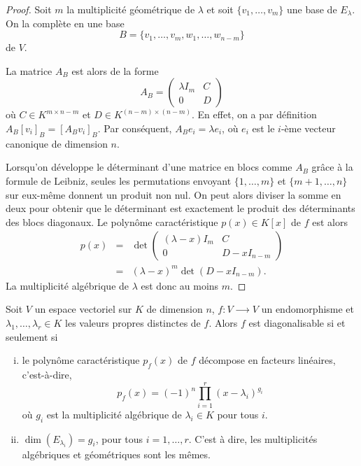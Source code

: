   \begin{proof}
    Soit $m$ la multiplicité géométrique de $λ$ et soit  $\{v_1,\dots,v_m\}$  une base de $E_{λ}$. On la complète en une base
    \begin{displaymath}
B =     \{ v_1,\dots,v_m, w_1,\dots,w_{n-m}\} 
    \end{displaymath}
    de $V$.

    La matrice $A_B$ est alors de la forme
    \begin{displaymath}
      A_B =
      \begin{pmatrix}
        λ I_m & C \\
        0 & D
      \end{pmatrix}
    \end{displaymath}
    où $C ∈ K^{m × n-m}$ et $D ∈ K^{(n-m) ×(n-m)}$. En effet, on a par définition $A_B[v_i]_{B} = [A_B v_i]_{B}$. Par conséquent, $A_B e_i = \lambda e_i$, où $e_i$ est le $i$-ème vecteur canonique de dimension $n$.
    
    Lorsqu'on développe le déterminant d'une matrice en blocs comme $A_B$ grâce à la formule de Leibniz, seules les permutations envoyant $\{1, \dots, m\}$ et $\{m+1, \dots, n\}$ sur eux-même donnent un produit non nul. On peut alors diviser la somme en deux pour obtenir que le déterminant est exactement le produit des déterminants des blocs diagonaux.
    Le polynôme caractéristique $p(x) ∈ K[x]$ de $f$ est alors
    \begin{eqnarray*} p(x) & = &  
      \det   \begin{pmatrix}
        (λ -x) I_m & C \\
        0 & D-xI_{n-m}
      \end{pmatrix} \\
          & = & (λ -x)^m \det \left(D-xI_{n-m}\right). 
    \end{eqnarray*}
    La multiplicité algébrique de $λ$ est donc au moins $m$. 
  \end{proof}



\begin{theorem}
  \label{thr:45}
  Soit $V$ un espace vectoriel sur $K$ de dimension $n$, $f:V⟶V$  un endomorphisme et $λ_1,\dots,λ_r ∈ K$ les valeurs propres distinctes de $f$.    Alors $f$ est diagonalisable si et seulement si 
  \begin{enumerate}[i)]
  \item le polynôme caractéristique $p_f(x)$ de $f$ décompose en facteurs linéaires, c'est-à-dire, \label{item:19} 
    \begin{displaymath}
      p_f(x) = (-1)^n ∏_{i=1}^r (x - λ_i )^{g_i}
    \end{displaymath}
    où $g_i$ est la multiplicité algébrique de $λ_i∈K$ pour tous $i$. 
    \item  $\dim(E_{λ_i}) = g_i$, pour tous $i=1,\dots,r$. C'est à dire, les multiplicités algébriques et géométriques sont les mêmes. \label{item:20}
  \end{enumerate}
\end{theorem}

